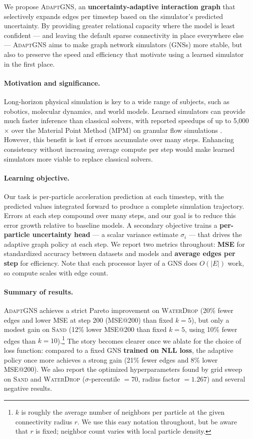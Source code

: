 \documentclass{article}
\begin{document}
We propose \textsc{AdaptGNS}, an \textbf{uncertainty-adaptive interaction graph} that selectively expands edges per timestep based on the simulator's predicted uncertainty. By providing greater relational capacity where the model is least confident — and leaving the default sparse connectivity in place everywhere else — \textsc{AdaptGNS} aims to make graph network simulators (GNSs) more stable, but also to preserve the speed and efficiency that motivate using a learned simulator in the first place.

\paragraph{Motivation and significance.}
Long-horizon physical simulation is key to a wide range of subjects, such as robotics, molecular dynamics, and world models. Learned simulators can provide much faster inference than classical solvers, 
with reported speedups of up to 5{,}000$\times$ over the Material Point Method (MPM) on granular flow  simulations \cite{gns_joss}. However, this benefit is lost if errors accumulate over many steps. Enhancing consistency without increasing average compute per step would make learned simulators more viable to replace classical solvers.

\paragraph{Learning objective.}
Our task is per-particle acceleration prediction at each timestep, with the predicted values integrated forward to produce a complete simulation trajectory. Errors at each step compound over many steps, and our goal is to reduce this error growth relative to baseline models. A secondary objective trains a \textbf{per-particle uncertainty head} — a scalar variance estimate $\sigma_i$ — that drives the adaptive graph policy at each step. We report two metrics throughout: \textbf{MSE} for standardized accuracy between datasets and models and \textbf{average edges per step} for efficiency. Note that each processor layer of a GNS does $O(|E|)$ work, so compute scales with edge count. 

\paragraph{Summary of results.} \textsc{AdaptGNS} achieves a strict Pareto improvement on \textsc{WaterDrop} (20\% fewer edges and lower MSE at step 200 (MSE@200) than fixed $k=5$), but only a modest gain on \textsc{Sand} (12\% lower MSE@200 than fixed $k=5$, using 10\% fewer edges than $k=10$).\footnote{$k$ is roughly the average number of neighbors per particle at the given connectivity radius $r$. We use this easy notation throughout, but be aware that $r$ is fixed; neighbor count varies with local particle density.} The story becomes clearer once we ablate for the choice of loss function: compared to a fixed GNS \textbf{trained on NLL loss}, the adaptive policy once more achieves a strong gain (21\% fewer edges and 8\% lower MSE@200). We also report the optimized hyperparameters found by grid sweep on \textsc{Sand} and \textsc{WaterDrop} ($\sigma$-percentile $= 70$, radius factor $= 1.267$) and several negative results.
\end{document}
